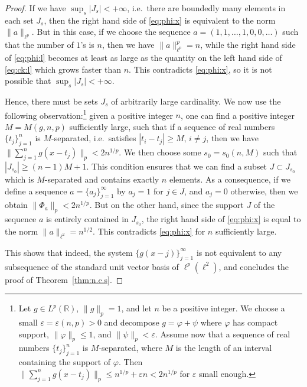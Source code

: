 \documentclass[reqno,a4paper,12pt]{amsart}
\numberwithin{equation}{section}
\numberwithin{figure}{section}
\newcommand\R{\mathbb{R}}
\newcommand\1{\mathds{1}}
\newcommand\eps{\varepsilon}
\newcommand{\pphi}{\varphi}
\renewcommand\le{\leqslant}
\renewcommand\ge{\geqslant}
\newcommand\sbt{\subset}
\theoremstyle{plain}
\newcommand{\thmref}[1]{Theorem~\ref{#1}}
\theoremstyle{definition}
\begin{document}
\begin{proof}
If we have $\sup_s |J_s| < + \infty$, 
i.e.\ there are boundedly many elements in each set $J_s$, then the right hand side of \eqref{eq:phi:x} is equivalent to the norm $\|a\|_{\ell^p}$. But in this case, if we choose the sequence $a=(1,1,\dots,1,0,0,\dots)$ such that the number of $1$'s is $n$, then we have $\|a\|^p_{\ell^p} = n$, while
the right hand side of \eqref{eq:phi:l}
becomes at least as large as the quantity on the left hand side of \eqref{eq:ck:l} which grows faster than $n$. This contradicts \eqref{eq:phi:x}, so it is not possible that $\sup_s |J_s| < + \infty$.


Hence, there must be sets $J_s$ of arbitrarily large cardinality. We now use the following observation:\footnote{Let $g \in L^p(\R)$, $\|g\|_p=1$, and let $n$ be a positive integer. We choose a small $\eps = \eps(n,p) > 0$ and decompose $g = \pphi + \psi$ where $\pphi$ has compact support, $\|\pphi\|_p \le 1$, and $\|\psi\|_p < \eps$. Assume now that a sequence of real numbers $\{t_j\}_{j=1}^{n} $ is $M$-separated, where $M$ is the length of an interval containing the support of $\pphi$. Then $\| \sum_{j=1}^{n} g(x-t_j) \|_p \le n^{1/p}+ \eps n < 2n^{1/p}$ for $\eps$  small enough.} 
given a positive integer $n$, one can find a positive integer $M=M(g,n,p)$ sufficiently large, such that if a sequence of real numbers $\{t_j\}_{j=1}^{n} $ is $M$-separated, i.e.\ satisfies $|t_i-t_j| \ge M$, $ i \neq j$, then we have
$\| \sum_{j=1}^{n} g(x-t_j) \|_p < 2n^{1/p}$. We then choose some $s_0 = s_0(n,M)$ such that $|J_{s_0}| \ge (n-1)M + 1$. This condition ensures that we can find a subset $J \sbt J_{s_0}$ which is $M$-separated and contains exactly $n$ elements. As a consequence, if we define a  sequence
$a = \{a_j\}_{j=1}^{\infty}$ by
$a_j = 1$ for $j \in J$, and $a_j = 0$ otherwise, then we obtain $\|\Phi_a\|_p < 2n^{1/p}$. But on the other hand, since the support $J$ of the sequence $a$ is entirely contained in $J_{s_0}$, the right hand side of \eqref{eq:phi:x} is equal to the norm $\|a\|_{\ell^2} = n^{1/2}$. This contradicts  \eqref{eq:phi:x} for $n$ sufficiently large.


This shows that indeed, the system 
$\{g(x-j)\}_{j=1}^{\infty}$ is not equivalent to any subsequence of the standard unit vector basis of $\ell^p(\ell^2)$, and concludes the proof of \thmref{thm:n.c.s}.
\end{proof}



\end{document}
